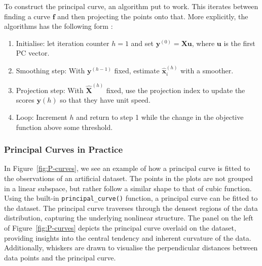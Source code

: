 \documentclass{article}\usepackage[]{graphicx}\usepackage[]{xcolor}
\numberwithin{equation}{section}
\begin{document}
\noindent To construct the principal curve, an algorithm put to work. This iterates between finding a curve $\mathbf{f}$ and then projecting the points onto that. More explicitly, the algorithms  has the following form \cite{pcurves}: 

\begin{enumerate}
  \item Initialise: let iteration counter $h = 1$ and set $\mathbf{y}^{(0)} = \mathbf{Xu}$, where $\mathbf{u}$ is the first PC vector. 
  \item Smoothing step: With $\mathbf{y}^{(h-1)}$ fixed, estimate $\mathbf{\hat{x}}_i^{(h)}$ with a smoother. 
  \item Projection step: With $\mathbf{\hat{X}}^{(h)}$ fixed, use the projection index to update the scores $\mathbf{y}{(h)}$ so that they have unit speed. 
  \item Loop: Increment $h$ and return to step 1 while the change in the objective function above some threshold.
\end{enumerate}

\subsubsection{Principal Curves in Practice}

\noindent In Figure~\ref{fig:P-curves}, we see an example of how a principal curve is fitted to the observations of an artificial dataset. The points in the plots are not grouped in a linear subspace, but rather follow a similar shape to that of cubic function.\\

\noindent Using the built-in \texttt{principal\_curve()} function, a principal curve can be fitted to the dataset. The principal curve traverses through the densest regions of the data distribution, capturing the underlying nonlinear structure. The panel on the left of Figure~\ref{fig:P-curves} depicts the principal curve overlaid on the dataset, providing insights into the central tendency and inherent curvature of the data. Additionally, whiskers are drawn to visualise the perpendicular distances between data points and the principal curve.
\end{document}
